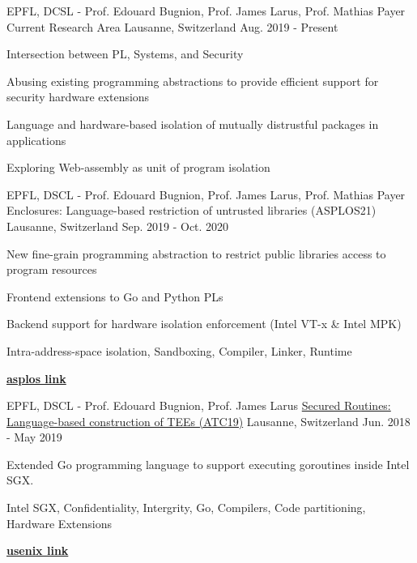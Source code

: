 


\begin{cventries}

\cventry
{EPFL, DCSL - Prof. Edouard Bugnion, Prof. James Larus, Prof. Mathias Payer}
{Current Research Area}
{Lausanne, Switzerland}
{Aug. 2019 - Present}
{ %
	\begin{cvitems}
  \item{Intersection between PL, Systems, and Security}
	\item{Abusing existing programming abstractions to provide efficient support for
    security hardware extensions}
  \item{Language and hardware-based isolation of mutually distrustful packages in applications}
  \item{Exploring Web-assembly as unit of program isolation}
	\end{cvitems}
}

\cventry
{EPFL, DSCL - Prof. Edouard Bugnion, Prof. James Larus, Prof. Mathias Payer}
  {Enclosures: Language-based restriction of untrusted libraries (ASPLOS21)}
{Lausanne, Switzerland}
{Sep. 2019  - Oct. 2020}
{
	\begin{cvitems}
  \item{New fine-grain programming abstraction to restrict public libraries access to program resources}
  \item{Frontend extensions to Go and Python PLs}
  \item{Backend support for hardware isolation enforcement (Intel VT-x \& Intel MPK)}
  \item{Intra-address-space isolation, Sandboxing, Compiler, Linker, Runtime}
  \item{\href{https://asplos-conference.org/papers/}{\textbf{asplos link}}}
	\end{cvitems}
}

\cventry
{EPFL, DSCL - Prof. Edouard Bugnion, Prof. James Larus}
  {\href{https://www.usenix.org/system/files/atc19-ghosn_0.pdf}{Secured Routines: Language-based construction of TEEs (ATC19)}}
{Lausanne, Switzerland}
{Jun. 2018  - May 2019}
{
	\begin{cvitems}
  \item{Extended Go programming language to  support executing goroutines inside Intel SGX.}
	\item{Intel SGX, Confidentiality, Intergrity, Go, Compilers, Code partitioning, Hardware Extensions}
  \item{\href{https://www.usenix.org/conference/atc19/presentation/ghosn}{\textbf{usenix link}}}
	\end{cvitems}
}


\end{cventries}
